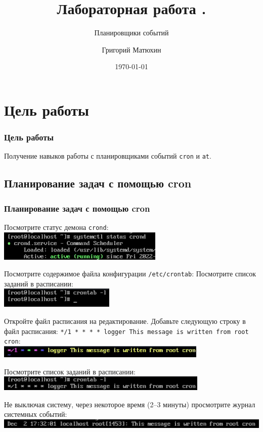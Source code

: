 \documentclass{beamer}
\author{Григорий Матюхин}
\date{\today}
\title{Лабораторная работа \textnumero8.}
\subtitle{Планировщики событий}
\begin{document}
\begin{frame}[plain]
	\titlepage
\end{frame}
\section{Цель работы}
\begin{frame}[plain]
	\frametitle{Цель работы}
	Получение навыков работы с планировщиками событий \texttt{cron} и \texttt{at}.
\end{frame}

\subsection{Планирование задач с помощью cron}
\begin{frame}[plain]
	\frametitle{Планирование задач с помощью cron}
	Посмотрите статус демона \texttt{crond}:
	\\\includegraphics{1.png}
\end{frame}
\begin{frame}[plain]
	Посмотрите содержимое файла конфигурации \texttt{/etc/crontab}:
	Посмотрите список заданий в расписании:
	\\\includegraphics{2.png}
\end{frame}
\begin{frame}[plain]
	Откройте файл расписания на редактирование. Добавьте следующую строку в файл расписания: \texttt{*/1 * * * * logger This message is written from root cron}:
	\\\includegraphics{3.png}
\end{frame}
\begin{frame}[plain]
	Посмотрите список заданий в расписании:
	\\\includegraphics{4.png}
\end{frame}
\begin{frame}[plain]
	Не выключая систему, через некоторое время (2–3 минуты) просмотрите журнал системных событий:
	\\\includegraphics{5.png}
\end{frame}
\end{document}

